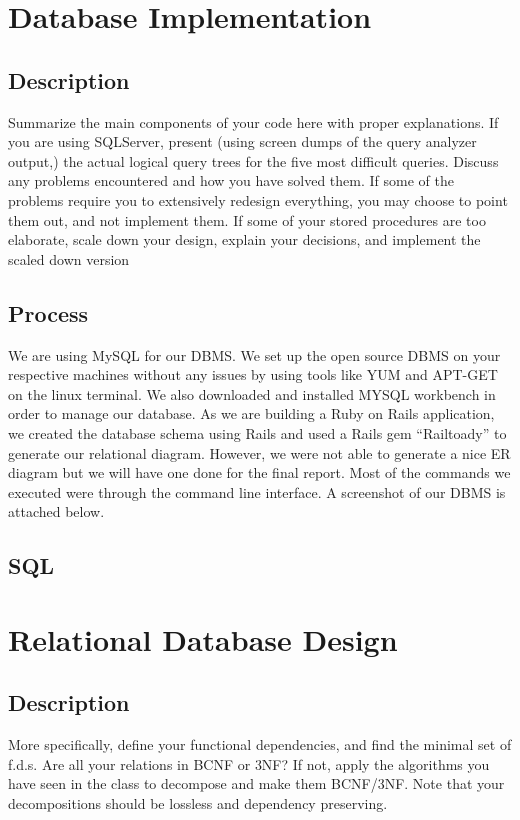 \documentclass[12pt,letterpaper]{article}
\begin{document}
\clearpage\null

\section{Database Implementation}

\subsection{Description}
Summarize the main components of your code here with proper explanations.
If you are using SQLServer, present (using screen dumps of the query analyzer output,) the actual
logical query trees for the five most difficult queries. Discuss any problems encountered and how
you have solved them. If some of the problems require you to extensively redesign everything, you
may choose to point them out, and not implement them. If some of your stored procedures are too
elaborate, scale down your design, explain your decisions, and implement the scaled down version

\subsection{Process}
We are using MySQL for our DBMS. We set up the open source DBMS on your respective machines without any issues by using tools like YUM and APT-GET on the linux terminal. We also downloaded and installed MYSQL workbench in order to manage our database. As we are building a Ruby on Rails application, we created the database schema using Rails and used a Rails gem “Railtoady” to generate our relational diagram. However, we were not able to generate a nice ER diagram but we will have one done for the final report. Most of the commands we executed were through the command line interface. A screenshot of our DBMS is attached below.

\subsection{SQL}

\clearpage\null

\section{Relational Database Design}

\subsection{Description}
More specifically, define your functional dependencies, and find the minimal set of f.d.s. Are all your relations in BCNF or 3NF? If not, apply the algorithms you have seen in the class to decompose and make them BCNF/3NF. Note that your decompositions should be lossless and dependency preserving.
\end{document}
